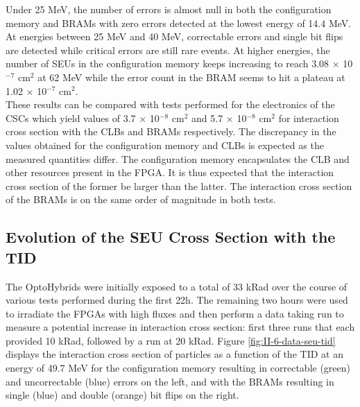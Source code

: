       Under 25 MeV, the number of errors is almost null in both the configuration memory and BRAMs with zero errors detected at the lowest energy of 14.4 MeV. At energies between 25 MeV and 40 MeV, correctable errors and single bit flips are detected while critical errors are still rare events. At higher energies, the number of SEUs in the configuration memory keeps increasing to reach 3.08 $ \times $ 10$^{-7}$ cm$^{2}$ at 62 MeV while the error count in the BRAM seems to hit a plateau at 1.02 $ \times $ 10$^{-7}$ cm$^2$. \\

      These results can be compared with tests performed for the electronics of the CSCs \cite{Bylsma2013242} which yield values of 3.7 $ \times $ 10$^{-8}$ cm$^2$ and 5.7 $ \times $ 10$^{-8}$ cm$^2$ for interaction cross section with the CLBs and BRAMs respectively. The discrepancy in the values obtained for the configuration memory and CLBs is expected as the measured quantities differ. The configuration memory encapsulates the CLB and other resources present in the FPGA. It is thus expected that the interaction cross section of the former be larger than the latter. The interaction cross section of the BRAMs is on the same order of magnitude in both tests.

    \subsection{Evolution of the SEU Cross Section with the TID}

      The OptoHybrids were initially exposed to a total of 33 kRad over the course of various tests performed during the first 22h. The remaining two hours were used to irradiate the FPGAs with high fluxes and then perform a data taking run to measure a potential increase in interaction cross section: first three runs that each provided 10 kRad, followed by a run at 20 kRad. Figure \ref{fig:II-6-data-seu-tid} displays the interaction cross section of particles as a function of the TID at an energy of 49.7 MeV for the configuration memory resulting in correctable (green) and uncorrectable (blue) errors on the left, and with the BRAMs resulting in single (blue) and double (orange) bit flips on the right. \\

